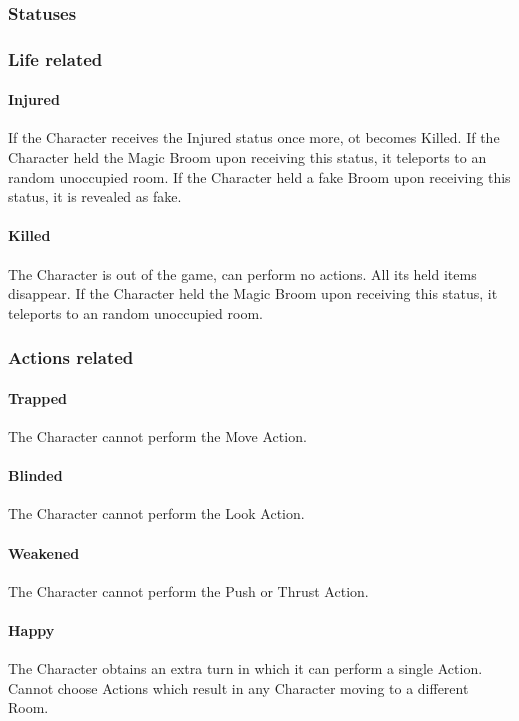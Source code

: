 \subsubsection{Statuses}

\subsubsection{Life related}

\paragraph{Injured} If the Character receives the Injured status once more, ot becomes Killed. 
If the Character held the Magic Broom upon receiving this status, it teleports to an random unoccupied room. 
If the Character held a fake Broom upon receiving this status, it is revealed as fake.

\paragraph{Killed} The Character is out of the game, can perform no actions. All its held items disappear.
If the Character held the Magic Broom upon receiving this status, it teleports to an random unoccupied room. 

\subsubsection{Actions related}

\paragraph{Trapped} The Character cannot perform the Move Action.
\paragraph{Blinded} The Character cannot perform the Look Action.
\paragraph{Weakened} The Character cannot perform the Push or Thrust Action.

\paragraph{Happy} The Character obtains an extra turn in which it can perform a single Action. Cannot choose Actions which result in any Character moving to a different Room.


